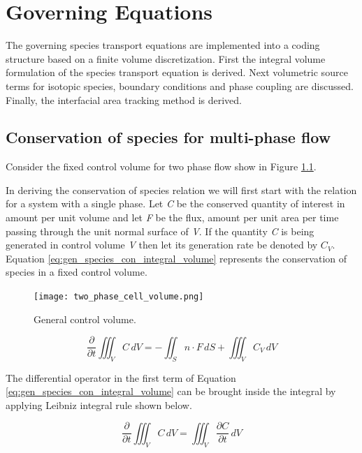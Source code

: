 \chapter{Governing Equations} \label{ch:gov_eqns}

The governing species transport equations are implemented into a coding structure based on a finite volume discretization. First the integral volume formulation of the species transport equation is derived. Next volumetric source terms for isotopic species, boundary conditions and phase coupling are discussed. Finally, the interfacial area tracking method is derived.

\section{Conservation of species for multi-phase flow}
Consider the fixed control volume for two phase flow show in Figure \ref{fig:gen_control_volume}.

In deriving the conservation of species relation we will first start with the relation for a system with a single phase. Let \textit{C} be the conserved quantity of interest in amount per unit volume and let \textit{F} be the flux, amount per unit area per time passing through the unit normal surface of \textit{V}. If the quantity \textit{C} is being generated in control volume \textit{V} then let its generation rate be denoted by ${C_{V}}$. Equation \ref{eq:gen_species_con_integral_volume} represents the conservation of species in a fixed control volume. 


\begin{figure}[ht]
  \centering
  \texttt{[image: two\_phase\_cell\_volume.png]}\\
  \caption{General control volume.}
  \label{fig:gen_control_volume}
\end{figure} 

\begin{equation}
	\frac{\partial }{\partial t}\iiint_V C \,dV = -\iint_S n \cdot F \,dS + \iiint_V C_{V} \,dV
	\label{eq:gen_species_con_integral_volume}
\end{equation}

The differential operator in the first term of Equation \ref{eq:gen_species_con_integral_volume} can be brought inside the integral by applying Leibniz integral rule shown below.

\begin{equation}
	\frac{\partial }{\partial t}\iiint_V C \,dV = \iiint_V \frac{\partial C}{\partial t}\,dV
\end{equation}

